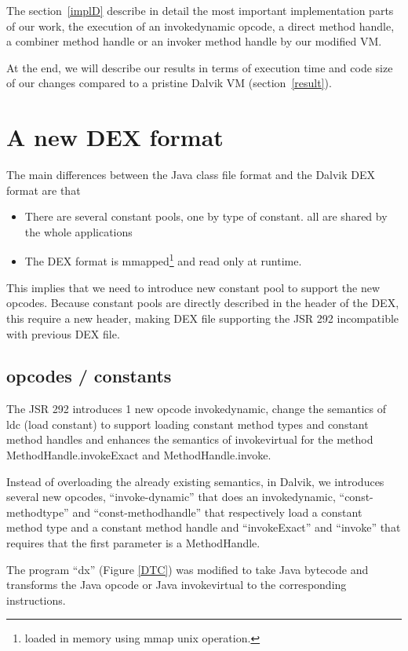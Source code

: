 \documentclass{sig-alternate}
\def \Jsr{JSR\xspace}
\def \JSR{\Jsr 292\xspace}
\begin{document}
  The section~\ref{implD} describe in detail the most important implementation parts of our work,
  the execution of an invokedynamic opcode, a direct method handle, a combiner method handle or
  an invoker method handle by our modified VM.
  
  At the end, we will describe our results in terms of execution time and code size of our changes
  compared to a pristine Dalvik VM (section~\ref{result}).\\

\section{A new DEX format}
\label{newDEX}

  The main differences between the Java class file format and the Dalvik DEX format
  are that
  \begin{itemize}
   \item There are several constant pools, one by type of constant.
         all are shared by the whole applications
   \item The DEX format is mmapped\footnote{loaded in memory using mmap unix operation.}
    and read only at runtime.
  \end{itemize}
  
  This implies that we need to introduce new constant pool to support the new opcodes.
  Because constant pools are directly described in the header of the DEX,
  this require a new header, making DEX file supporting the JSR 292 incompatible
  with previous DEX file.
  
  \subsection{opcodes / constants}
    The \JSR introduces 1 new opcode invokedynamic, change the semantics of ldc (load constant)
    to support loading constant method types and constant method handles and enhances the semantics
    of invokevirtual for the method MethodHandle.invokeExact and MethodHandle.invoke.

    Instead of overloading the already existing semantics, in Dalvik, we introduces several new opcodes,
    ``invoke-dynamic'' that does an invokedynamic,
    ``const-methodtype'' and ``const-methodhandle'' that respectively load a constant method type
    and a constant method handle and ``invokeExact'' and ``invoke'' that requires that the first parameter
    is a MethodHandle.

    The program ``dx'' (Figure \ref{DTC}) was modified to take Java bytecode and 
    transforms the Java opcode or Java invokevirtual to the corresponding instructions.
\end{document}

